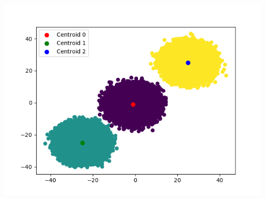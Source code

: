\documentclass[11pt]{article}
\makeatletter
\def\maxwidth{\ifdim\Gin@nat@width>\linewidth\linewidth
    \else\Gin@nat@width\fi}
\let\Oldincludegraphics\includegraphics
\renewcommand{\includegraphics}[1]{\Oldincludegraphics[width=.8\maxwidth]{#1}}
\makeatother
\begin{document}
\begin{center}
	\includegraphics{../images/clusters.png}\\
\end{center}
\end{document}
